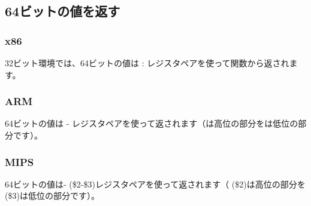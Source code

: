 ﻿\subsection{64ビットの値を返す}



\subsubsection{x86}

32ビット環境では、64ビットの値は \EDX{}:\EAX{} レジスタペアを使って関数から返されます。



\subsubsection{ARM}

64ビットの値は - レジスタペアを使って返されます（は高位の部分をは低位の部分です）。



\subsubsection{MIPS}

64ビットの値は- (\$2-\$3)レジスタペアを使って返されます（ (\$2)は高位の部分を (\$3)は低位の部分です）。




